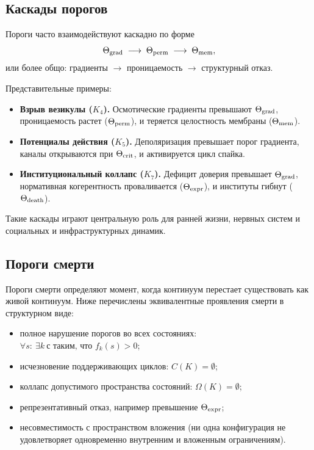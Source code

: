 \subsection{Каскады порогов}

Пороги часто взаимодействуют каскадно по форме
\[
  \Theta_{\rm grad}
  \;\longrightarrow\;
  \Theta_{\rm perm}
  \;\longrightarrow\;
  \Theta_{\rm mem},
\]
или более общо: градиенты \(\to\) проницаемость \(\to\) структурный отказ.

Представительные примеры:

\begin{itemize}
    \item \textbf{Взрыв везикулы (\(K_4\)).}
          Осмотические градиенты превышают \(\Theta_{\rm grad}\), проницаемость растет
          (\(\Theta_{\rm perm}\)), и теряется целостность мембраны
          (\(\Theta_{\rm mem}\)).
    \item \textbf{Потенциалы действия (\(K_5\)).}
          Деполяризация превышает порог градиента, каналы открываются при
          \(\Theta_{\rm crit}\), и активируется цикл спайка.
    \item \textbf{Институциональный коллапс (\(K_7\)).}
          Дефицит доверия превышает \(\Theta_{\rm grad}\), нормативная когерентность
          проваливается (\(\Theta_{\rm expr}\)), и институты гибнут
          (\(\Theta_{\rm death}\)).
\end{itemize}

Такие каскады играют центральную роль для ранней жизни, нервных систем и
социальных и инфраструктурных динамик.

\subsection{Пороги смерти}

Пороги смерти определяют момент, когда континуум перестает существовать как живой
континуум. Ниже перечислены эквивалентные проявления смерти в структурном виде:
\begin{itemize}
    \item полное нарушение порогов во всех состояниях:
          \(\forall s:\ \exists k\ \text{с таким, что } f_k(s) > 0\);
    \item исчезновение поддерживающих циклов: \(C(K)=\emptyset\);
    \item коллапс допустимого пространства состояний: \(\Omega(K)=\emptyset\);
    \item репрезентативный отказ, например превышение \(\Theta_{\rm expr}\);
    \item несовместимость с пространством вложения (ни одна конфигурация
          не удовлетворяет одновременно внутренним и вложенным ограничениям).
\end{itemize}

